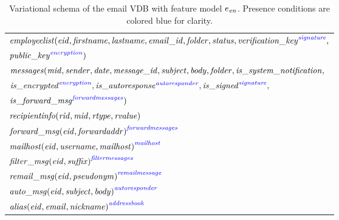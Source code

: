 \begin{table}
\caption[Variational schema of the email VDB]{Variational schema of the email VDB with feature model 
\ensuremath{\dimMeta_\enron}. 
Presence conditions are colored blue for clarity.
}
\label{tab:enron-vsch}
\centering
\small
\begin{tabular}{!{\color{black}\vrule} l !{\color{black}\vrule}}
\hline
$\employees(\eid,\fname,\lname,\emailid,\folder,\status,
 \annot[\fsignature]{\verificationkey},$\\
\hspace{60pt} $  \annot[\fencryption]{\publickey})$ \\
$\messages(\midatt, \sender, \dateatt, \messageid, \subject, \body, \folder,
  \issystemnotification,$\\
\hspace{44pt}  $  \annot[\fencryption]{\isencrypted},
\annot[\fautoresponder]{\isautoresponse},\annot[\fsignature]{\issigned},$\\
\hspace{44pt} $  \annot[\fforwardmsg]{\isforwardmsg})$\\
$\recipientinfo(\rid, \midatt, \rtype, \rvalue)$ \\
${\forwardmsg(\eid, \forwardaddr)}^{\fforwardmsg}$ \\
${\mailhost(\eid, \username, \mailhost)}^{\fmailhost}$\\
${\filtermsg(\eid, \suffix)}^{\ffiltermsg}$\\
${\remailmsg(\eid, \pseudonym)}^{\fremailmsg}$\\
${\automsg(\eid, \subject, \body)}^{\fautoresponder}$\\
${\alias(\eid, \emailAtt, \nickname)}^{\faddressbook}$\\
\hline
\end{tabular}
\end{table}

